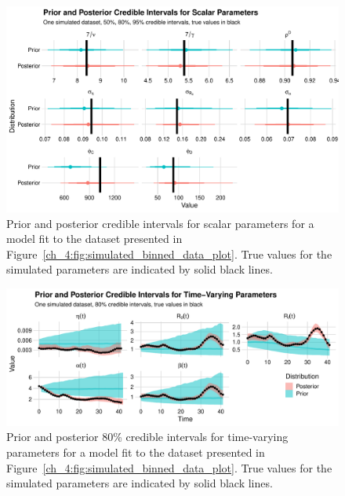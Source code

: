\begin{figure}[htbp]
    \centering
    \includegraphics[width=1.0\columnwidth]{single_generated_quantities_simulation_scalar_plot}
    \caption{Prior and posterior credible intervals for scalar parameters for a model fit to the dataset presented in Figure~\ref{ch_4:fig:simulated_binned_data_plot}.
    True values for the simulated parameters are indicated by solid black lines.}
    \label{ch_4:fig:single_generated_quantities_simulation_scalar_plot}
\end{figure}

\begin{figure}[htbp]
    \centering
    \includegraphics[width=1.0\columnwidth]{single_generated_quantities_simulation_time_varying_plot}
    \caption{Prior and posterior 80\% credible intervals for time-varying parameters for a model fit to the dataset presented in Figure~\ref{ch_4:fig:simulated_binned_data_plot}.
    True values for the simulated parameters are indicated by solid black lines.}
    \label{ch_4:fig:single_generated_quantities_simulation_time_varying_plot}
\end{figure}

